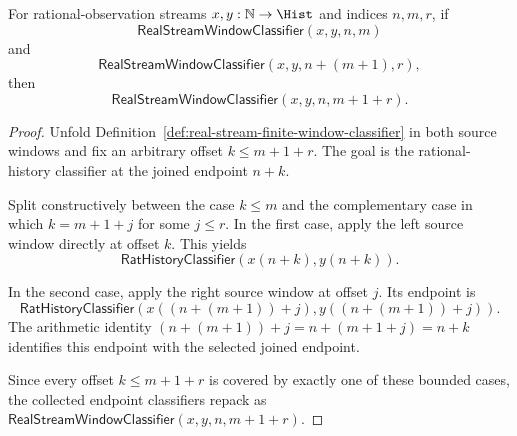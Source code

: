 \begin{theorem}
\label{thm:real-stream-window-adjacent-concatenation}
For rational-observation streams $x,y:\mathbb{N}\to\Hist$ and indices
$n,m,r$, if
$$
\mathsf{RealStreamWindowClassifier}(x,y,n,m)
$$
and
$$
\mathsf{RealStreamWindowClassifier}(x,y,n+(m+1),r),
$$
then
$$
\mathsf{RealStreamWindowClassifier}(x,y,n,m+1+r).
$$
\end{theorem}
\begin{proof}
Unfold Definition~\ref{def:real-stream-finite-window-classifier} in both
source windows and fix an arbitrary offset $k\le m+1+r$. The goal is the
rational-history classifier at the joined endpoint $n+k$.

Split constructively between the case $k\le m$ and the complementary case in
which $k=m+1+j$ for some $j\le r$. In the first case, apply the left source
window directly at offset $k$. This yields
$$
\mathsf{RatHistoryClassifier}(x(n+k),y(n+k)).
$$

In the second case, apply the right source window at offset $j$. Its endpoint
is
$$
\mathsf{RatHistoryClassifier}(x((n+(m+1))+j),y((n+(m+1))+j)).
$$
The arithmetic identity $(n+(m+1))+j=n+(m+1+j)=n+k$ identifies this endpoint
with the selected joined endpoint.

Since every offset $k\le m+1+r$ is covered by exactly one of these bounded
cases, the collected endpoint classifiers repack as
$\mathsf{RealStreamWindowClassifier}(x,y,n,m+1+r)$.
\end{proof}

